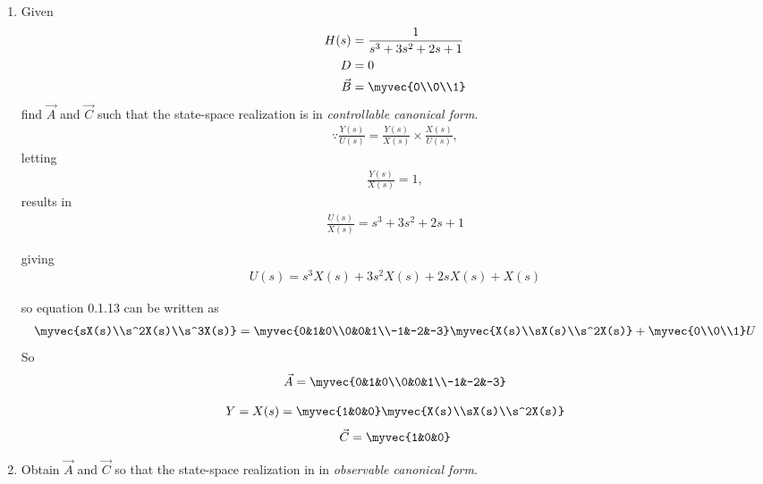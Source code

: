 \begin{enumerate}[label=\thesection.\arabic*.,ref=\thesection.\theenumi]
\item Given 
\begin{align}
H(s)&=\frac{1}{s^3+3s^2+2s+1}
\\
D&=0
\\
\vec{B}&= \myvec{0\\0\\1}
\end{align}
%
 find $\vec{A}$ and $\vec{C}$ such that the state-space realization is in {\em controllable canonical form}.
\\
\solution 
\begin{align} 
\because {\frac{Y(s)}{U(s)}}= \frac{Y(s)}{X(s)} \times \frac{X(s)}{U(s)},
\end{align}
letting
\begin{align}
 {\frac{Y(s)}{X(s)}}= 1, 
\end{align}
results in 
\begin{align}
{\frac{U(s)}{X(s)}}={s^3 + 3s^2+2s + 1}
\end{align}

giving
\begin{align}
U(s)= s^3 X(s) + 3s^2 X(s)+2sX(s) + X(s)
\end{align}

so equation 0.1.13 can be written as
\begin{align}
\myvec{sX(s)\\s^2X(s)\\s^3X(s)}
=
\myvec{0&1&0\\0&0&1\\-1&-2&-3}\myvec{X(s)\\sX(s)\\s^2X(s)}
+
\myvec{0\\0\\1}  U
\end{align}
So 
\begin{align}
\vec{A}=\myvec{0&1&0\\0&0&1\\-1&-2&-3}
\end{align}

\begin{align}
Y=X(s)
=\myvec{1&0&0} \myvec{X(s)\\sX(s)\\s^2X(s)}
\end{align}
\begin{align}
\vec{C}=\myvec{1&0&0}
\end{align}

\item Obtain $\vec{A}$ and $\vec{C}$ so that the state-space realization in in {\em observable canonical form}.


\end{enumerate}
